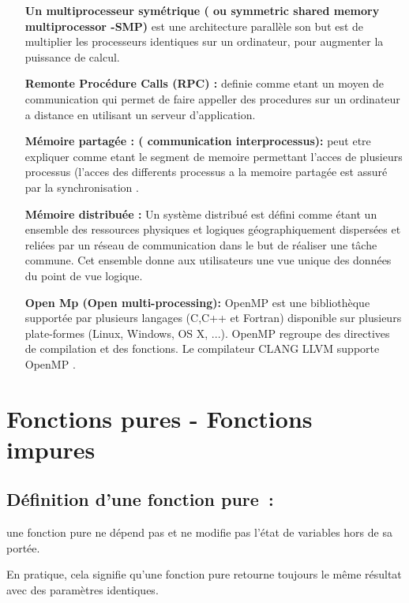 \documentclass[12pt,titlepage]{article}
\begin{document}
\begin{itemize}
\item[\textbf{ Un multiprocesseur symétrique ( ou symmetric shared memory multiprocessor -SMP) } ] est une architecture parallèle son but est de multiplier les processeurs identiques sur un ordinateur, pour augmenter la puissance de calcul.

\item[\textbf{ Remonte Procédure Calls (RPC) : }] definie comme etant un moyen de communication qui permet de faire appeller des procedures sur un ordinateur a distance en utilisant un serveur d'application.

\item[\textbf{ Mémoire partagée : ( communication interprocessus): } ] peut etre expliquer comme etant le segment de memoire permettant l'acces de plusieurs processus (l'acces des differents processus a la memoire partagée est assuré par la synchronisation .

\item[\textbf{ Mémoire distribuée : }] Un système distribué est défini comme étant un ensemble des ressources physiques et logiques géographiquement dispersées et reliées par un réseau de communication dans le but de réaliser une tâche commune. Cet ensemble donne aux utilisateurs une vue unique des données du point de vue logique.

\item[\textbf{ Open Mp (Open multi-processing):}] OpenMP est une bibliothèque supportée par plusieurs langages (C,C++ et Fortran) disponible sur plusieurs plate-formes (Linux, Windows, OS X, ...). OpenMP regroupe des directives de compilation et des fonctions. Le compilateur CLANG LLVM supporte OpenMP .


\end{itemize}

\section{Fonctions pures - Fonctions impures}


\subsection{Définition d’une fonction pure :}

une fonction pure ne dépend pas et ne modifie pas l'état de variables hors de sa portée.

En pratique, cela signifie qu'une fonction pure retourne toujours le même résultat avec des paramètres identiques.
\end{document}
